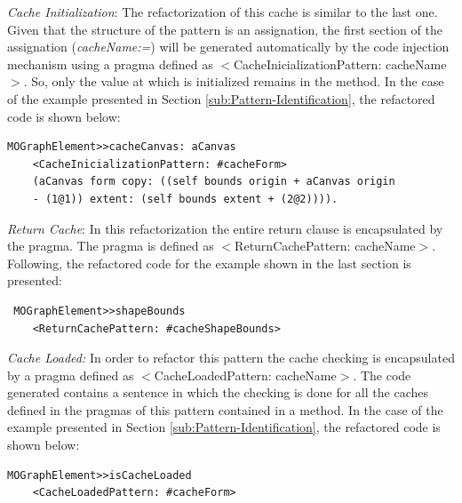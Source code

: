 \documentclass[runningheads]{llncs}
\begin{document}
\emph{Cache Initialization}: The refactorization of this cache is
similar to the last one. Given that the structure of the pattern is
an assignation, the first section of the assignation (\emph{cacheName:=})
will be generated automatically by the code injection mechanism using
a pragma defined as $<$CacheInicializationPattern: cacheName$>$.
So, only the value at which is initialized remains in the method.
In the case of the example presented in Section \ref{sub:Pattern-Identification},
the refactored code is shown below:

\begin{lstlisting} 
MOGraphElement>>cacheCanvas: aCanvas 
	<CacheInicializationPattern: #cacheForm>  
	(aCanvas form copy: ((self bounds origin + aCanvas origin
	- (1@1)) extent: (self bounds extent + (2@2)))). 
\end{lstlisting}

\emph{Return Cache}: In this refactorization the entire return clause
is encapsulated by the pragma. The pragma is defined as $<$ReturnCachePattern:
cacheName$>$. Following, the refactored code for the example shown in
the last section is presented:

\begin{lstlisting}
 MOGraphElement>>shapeBounds 
	<ReturnCachePattern: #cacheShapeBounds> 
\end{lstlisting}

\emph{Cache Loaded:} In order to refactor this pattern the cache checking
is encapsulated by a pragma defined as $<$CacheLoadedPattern:
cacheName$>$. The code generated contains a sentence in which the checking
is done for all the caches defined in the pragmas of this pattern
contained in a method. In the case of the example presented in Section
\ref{sub:Pattern-Identification}, the refactored code is shown below:
\begin{lstlisting} 
MOGraphElement>>isCacheLoaded 
	<CacheLoadedPattern: #cacheForm>
\end{lstlisting}
\end{document}
